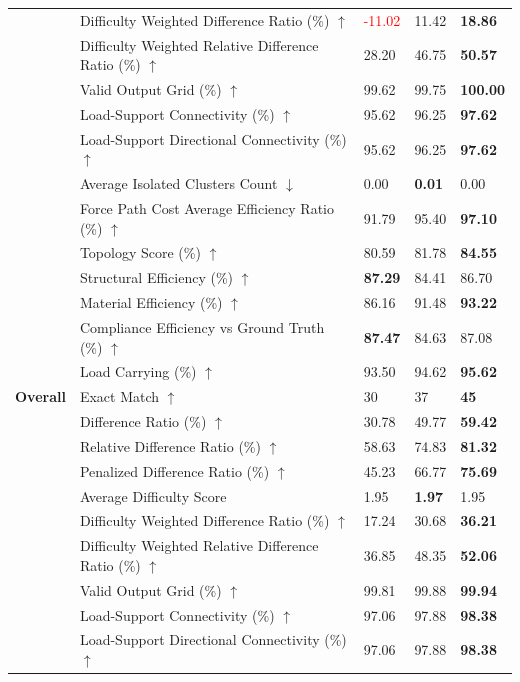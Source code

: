 \begin{table}[!h]
{\begin{tabular}{lllll}
 & Difficulty Weighted Difference Ratio (\%) $\uparrow$ & \textcolor{red}{-11.02} & 11.42 & \textbf{18.86} \\
 & Difficulty Weighted Relative Difference Ratio (\%) $\uparrow$ & 28.20 & 46.75 & \textbf{50.57} \\
 & Valid Output Grid (\%) $\uparrow$ & 99.62 & 99.75 & \textbf{100.00} \\
 & Load-Support Connectivity (\%) $\uparrow$ & 95.62 & 96.25 & \textbf{97.62} \\
 & Load-Support Directional Connectivity (\%) $\uparrow$ & 95.62 & 96.25 & \textbf{97.62} \\
 & Average Isolated Clusters Count $\downarrow$ & 0.00 & \textbf{0.01} & 0.00 \\
 & Force Path Cost Average Efficiency Ratio (\%) $\uparrow$ & 91.79 & 95.40 & \textbf{97.10} \\
 & Topology Score (\%) $\uparrow$ & 80.59 & 81.78 & \textbf{84.55} \\
 & Structural Efficiency (\%) $\uparrow$ & \textbf{87.29} & 84.41 & 86.70 \\
 & Material Efficiency (\%) $\uparrow$ & 86.16 & 91.48 & \textbf{93.22} \\
 & Compliance Efficiency vs Ground Truth (\%) $\uparrow$ & \textbf{87.47} & 84.63 & 87.08 \\
 & Load Carrying (\%) $\uparrow$ & 93.50 & 94.62 & \textbf{95.62} \\
\midrule\midrule
\textbf{Overall} & Exact Match $\uparrow$ & 30 & 37 & \textbf{45} \\
 & Difference Ratio (\%) $\uparrow$ & 30.78 & 49.77 & \textbf{59.42} \\
 & Relative Difference Ratio (\%) $\uparrow$ & 58.63 & 74.83 & \textbf{81.32} \\
 & Penalized Difference Ratio (\%) $\uparrow$ & 45.23 & 66.77 & \textbf{75.69} \\
 & Average Difficulty Score & 1.95 & \textbf{1.97} & 1.95 \\
 & Difficulty Weighted Difference Ratio (\%) $\uparrow$ & 17.24 & 30.68 & \textbf{36.21} \\
 & Difficulty Weighted Relative Difference Ratio (\%) $\uparrow$ & 36.85 & 48.35 & \textbf{52.06} \\
 & Valid Output Grid (\%) $\uparrow$ & 99.81 & 99.88 & \textbf{99.94} \\
 & Load-Support Connectivity (\%) $\uparrow$ & 97.06 & 97.88 & \textbf{98.38} \\
 & Load-Support Directional Connectivity (\%) $\uparrow$ & 97.06 & 97.88 & \textbf{98.38} \\

\end{tabular}}
\end{table}

